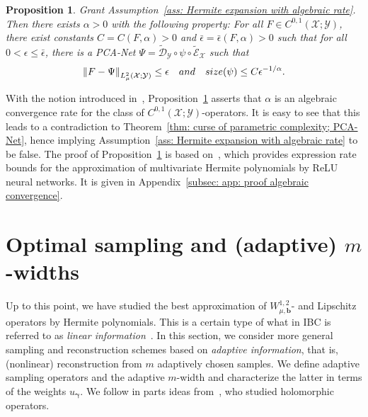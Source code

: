 \documentclass[namedate,webpdf]{ima-authoring-template-blank}
\newcommand*{\nm}[1]{{\left\|#1\right \|}}
\newcounter{counter}
\numberwithin{counter}{section}
\numberwithin{equation}{section}
\theoremstyle{plain}
\newtheorem{proposition}[counter]{Proposition}
\theoremstyle{definition}
\newcommand*{\cD}{\mathcal{D}}
\newcommand*{\cE}{\mathcal{E}}
\newcommand*{\cX}{\mathcal{X}}
\newcommand*{\cY}{\mathcal{Y}}
\theoremstyle{thmstyletwo}
\begin{document}
\begin{proposition}
\label{prop: algebraic convergence rate for C01}
    Grant Assumption~\ref{ass: Hermite expansion with algebraic rate}.
    Then there exists \(\alpha > 0\) with the following property: For all \(F \in C^{0, 1}(\cX; \cY)\), there exist constants \(C = C(F, \alpha) > 0\) and \(\bar{\epsilon} = \bar{\epsilon}(F, \alpha) > 0\) such that for all \(0 < \epsilon \leq \bar{\epsilon}\), there is a PCA-Net \(\Psi = \widetilde{\cD}_{\cY} \circ \psi \circ \widetilde{\cE}_{\cX}\) such that 
    \[
    \nm{F - \Psi}_{L_{\mu}^2(\cX; \cY)} \leq \epsilon \quad \textup{and} \quad 
    \textup{size}(\psi) \leq C \epsilon^{-1/\alpha}.
    \]
\end{proposition}

With the notion introduced in~\citet{lanthaler_OperatorLearningPCANetUpper_2023}, Proposition~\ref{prop: algebraic convergence rate for C01} asserts that \(\alpha\) is an algebraic convergence rate for the class of \(C^{0, 1}(\cX; \cY)\)-operators.
It is easy to see that this leads to a contradiction to Theorem~\ref{thm: curse of parametric complexity; PCA-Net}, hence implying Assumption~\ref{ass: Hermite expansion with algebraic rate} to be false.
The proof of Proposition~\ref{prop: algebraic convergence rate for C01} is based on~\citet[Thm. 3.9]{schwab_DeepLearningHighDimension_2023}, which provides expression rate bounds for the approximation of multivariate Hermite polynomials by ReLU neural networks. It is given in Appendix~\ref{subsec: app: proof algebraic convergence}.







\section{Optimal sampling and (adaptive) \texorpdfstring{\(m\)}{m}-widths}
\label{sec: optimal sampling and adaptive m-widths}

Up to this point, we have studied the best approximation of \(W_{\mu, \bm{b}}^{1, 2}\)- and Lipschitz operators by Hermite polynomials. This is a certain type of what in IBC is referred to as \emph{linear information}~\citep[Ch. 4.1.1]{novak_TractabilityMultivariateProblemsVolume_2008}. In this section, we consider more general sampling and reconstruction schemes based on \emph{adaptive information}, that is, (nonlinear) reconstruction from \(m\) adaptively chosen samples. We define adaptive sampling operators and the adaptive \(m\)-width and characterize the latter in terms of the weights \(u_{\bm{\gamma}}\). We follow in parts ideas from~\citet{adcock_OptimalApproximationInfinitedimensionalHolomorphic_2024}, who studied holomorphic operators.
\end{document}
